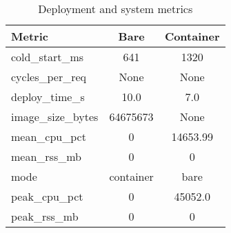 \begin{table}[t]
\caption{Deployment and system metrics}
\centering
\begin{tabular}{lcc}
Metric & Bare & Container \\
\hline
cold\_start\_ms & 641 & 1320 \\
cycles\_per\_req & None & None \\
deploy\_time\_s & 10.0 & 7.0 \\
image\_size\_bytes & 64675673 & None \\
mean\_cpu\_pct & 0 & 14653.99 \\
mean\_rss\_mb & 0 & 0 \\
mode & container & bare \\
peak\_cpu\_pct & 0 & 45052.0 \\
peak\_rss\_mb & 0 & 0 \\
\end{tabular}
\end{table}
